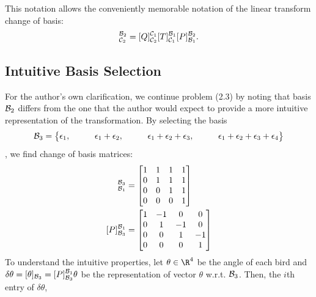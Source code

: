 \documentclass{homework}
\begin{document}
This notation allows the conveniently memorable notation of the
linear transform change of basis:
\begin{equation}
    [T]_{\mathcal{C}_2}^{\basis_2} = [Q]_{\mathcal{C}_2}^{\mathcal{C}_1}
        [T]_{\mathcal{C}_1}^{\basis_1}
        [P]_{\basis_1}^{\basis_2}.
\end{equation}

\subsection{Intuitive Basis Selection}
\label{sec:intuitive-basis}
For the author's own clarification, we continue problem (2.3) by noting that
basis $\mathcal{B}_2$ differs from
the one that the author would expect to provide a more intuitive
representation of the transformation. By selecting the basis
\begin{equation}
    \mathcal{B}_3 = \begin{Bmatrix}
    \epsilon_1, &\qquad
    \epsilon_1 + \epsilon_2, &\qquad
    \epsilon_1 + \epsilon_2 + \epsilon_3, &\qquad
    \epsilon_1 + \epsilon_2 + \epsilon_3 + \epsilon_4
    \end{Bmatrix}
\end{equation}
, we find
change of basis matrices:
\begin{align}
    [P]_{\basis_1}^{\basis_3} &= \begin{bmatrix}
        1 & 1 & 1 & 1 \\
        0 & 1 & 1 & 1 \\
        0 & 0 & 1 & 1 \\
        0 & 0 & 0 & 1
    \end{bmatrix} \\
    [P]_{\basis_3}^{\basis_1} &= \begin{bmatrix}
        1 & -1 & 0 & 0 \\
        0 & 1 & -1 & 0 \\
        0 & 0 & 1 & -1 \\
        0 & 0 & 0 & 1
    \end{bmatrix}
\end{align}
To understand the intuitive properties, let $\theta \in \R^4$
be the angle of each bird and
$\delta\theta = [\theta]_{\mathcal{B}_3} = [P]_{\mathcal{B}_3}^{\mathcal{B}_1} \theta$
be the representation of vector $\theta$ w.r.t. $\mathcal{B}_3$.
Then, the $i$th entry of $\delta\theta$,
\end{document}
